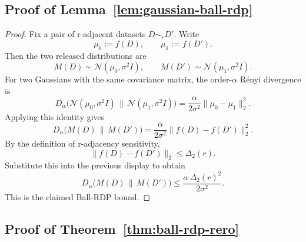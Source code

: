 \documentclass[conference,compsoc]{IEEEtran}
\begin{document}
\subsection{Proof of Lemma~\ref{lem:gaussian-ball-rdp}}

\begin{proof}
Fix a pair of r-adjacent datasets $D\sim_r D'$. Write
\[
\mu_0:=f(D),
\qquad
\mu_1:=f(D').
\]
Then the two released distributions are
\[
M(D)\sim \mathcal{N}(\mu_0,\sigma^2 I),
\qquad
M(D')\sim \mathcal{N}(\mu_1,\sigma^2 I).
\]
For two Gaussians with the same covariance matrix, the order-$\alpha$ Rényi divergence is
\[
D_\alpha\big(\mathcal{N}(\mu_0,\sigma^2 I)\,\|\,\mathcal{N}(\mu_1,\sigma^2 I)\big)
=
\frac{\alpha}{2\sigma^2}\|\mu_0-\mu_1\|_2^2.
\]
Applying this identity gives
\[
D_\alpha\big(M(D)\,\|\,M(D')\big)
=
\frac{\alpha}{2\sigma^2}\|f(D)-f(D')\|_2^2.
\]
By the definition of r-adjacency sensitivity,
\[
\|f(D)-f(D')\|_2\le \Delta_2(r).
\]
Substitute this into the previous display to obtain
\[
D_\alpha\big(M(D)\,\|\,M(D')\big)
\le
\frac{\alpha\,\Delta_2(r)^2}{2\sigma^2}.
\]
This is the claimed Ball-RDP bound.
\end{proof}

\subsection{Proof of Theorem~\ref{thm:ball-rdp-rero}}
\end{document}
